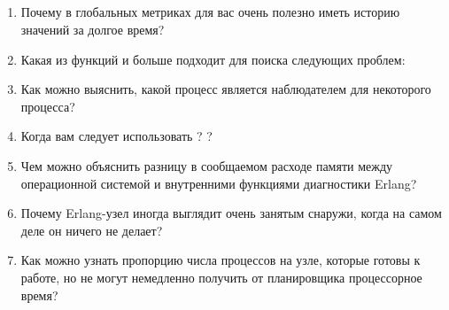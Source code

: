 \subsection*{\OpenEndedTitle{}}

\begin{enumerate}
	\item Почему в глобальных метриках для вас очень полезно иметь историю значений за долгое время?
	\item Какая из функций  и  больше подходит для поиска следующих проблем:
	\item Как можно выяснить, какой процесс является наблюдателем для некоторого процесса?
	\item Когда вам следует использовать ? ?
	\item Чем можно объяснить разницу в сообщаемом расходе памяти между операционной системой и внутренними функциями диагностики Erlang?
	\item Почему Erlang-узел иногда выглядит очень занятым снаружи, когда на самом деле он ничего не делает?
	\item Как можно узнать пропорцию числа процессов на узле, которые готовы к работе, но не могут немедленно получить от планировщика процессорное время?
\end{enumerate}

